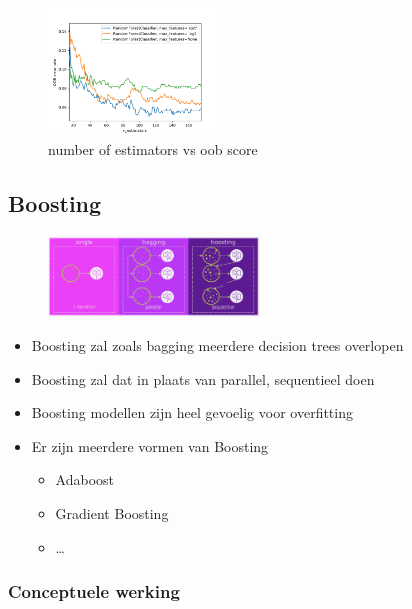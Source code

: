\documentclass{article}
\begin{document}
\begin{figure}[H]
    \centering
    \includegraphics[width=0.4\textwidth]{bagging-random-forest-trees2.png}
    \caption{number of estimators vs oob score}
\end{figure}


\subsection{Boosting}

\begin{figure}[H]
    \centering
    \includegraphics[width=0.5\textwidth]{boosting-principe.png}
    \caption{}
\end{figure}

\begin{itemize}
    \item Boosting zal zoals bagging meerdere decision trees overlopen
    \item Boosting zal dat in plaats van parallel, sequentieel doen
    \item Boosting modellen zijn heel gevoelig voor overfitting
    \item Er zijn meerdere vormen van Boosting
    \begin{itemize}
        \item Adaboost
        \item Gradient Boosting
        \item \dots
    \end{itemize}
\end{itemize}

\subsubsection{Conceptuele werking}
\end{document}
